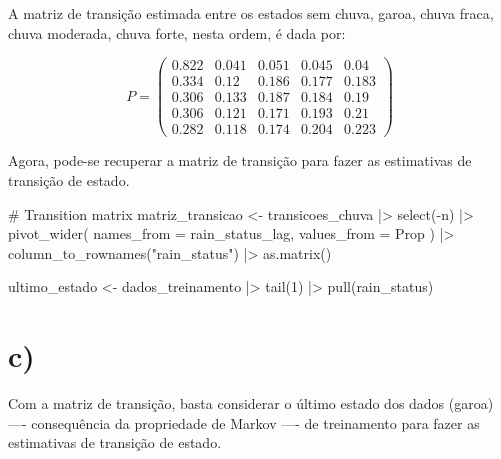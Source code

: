 \documentclass[
  letterpaper,
  DIV=11,
  numbers=noendperiod]{scrreprt}
\newenvironment{Shaded}{\begin{snugshade}}{\end{snugshade}}
\newcommand{\AttributeTok}[1]{\textcolor[rgb]{0.40,0.45,0.13}{#1}}
\newcommand{\CommentTok}[1]{\textcolor[rgb]{0.37,0.37,0.37}{#1}}
\newcommand{\DecValTok}[1]{\textcolor[rgb]{0.68,0.00,0.00}{#1}}
\newcommand{\FunctionTok}[1]{\textcolor[rgb]{0.28,0.35,0.67}{#1}}
\newcommand{\NormalTok}[1]{\textcolor[rgb]{0.00,0.23,0.31}{#1}}
\newcommand{\OtherTok}[1]{\textcolor[rgb]{0.00,0.23,0.31}{#1}}
\newcommand{\SpecialCharTok}[1]{\textcolor[rgb]{0.37,0.37,0.37}{#1}}
\newcommand{\StringTok}[1]{\textcolor[rgb]{0.13,0.47,0.30}{#1}}
\begin{document}
A matriz de transição estimada entre os estados sem chuva, garoa, chuva
fraca, chuva moderada, chuva forte, nesta ordem, é dada por:

\begin{equation}
P =
\begin{pmatrix}
0.822 & 0.041 &  0.051 & 0.045 &  0.04 \\
0.334 & 0.12 &  0.186 & 0.177 &  0.183 \\
0.306 & 0.133 &  0.187 & 0.184 &  0.19 \\
0.306 & 0.121 &  0.171 & 0.193 &  0.21 \\
0.282 & 0.118 &  0.174 & 0.204 &  0.223 
\end{pmatrix}
\end{equation}

Agora, pode-se recuperar a matriz de transição para fazer as estimativas
de transição de estado.

\begin{Shaded}
\begin{Highlighting}[]
\CommentTok{\# Transition matrix}
\NormalTok{matriz\_transicao }\OtherTok{\textless{}{-}}
\NormalTok{    transicoes\_chuva }\SpecialCharTok{|\textgreater{}}
    \FunctionTok{select}\NormalTok{(}\SpecialCharTok{{-}}\NormalTok{n) }\SpecialCharTok{|\textgreater{}}
    \FunctionTok{pivot\_wider}\NormalTok{(}
        \AttributeTok{names\_from =}\NormalTok{ rain\_status\_lag,}
        \AttributeTok{values\_from =}\NormalTok{ Prop}
\NormalTok{    ) }\SpecialCharTok{|\textgreater{}}
    \FunctionTok{column\_to\_rownames}\NormalTok{(}\StringTok{"rain\_status"}\NormalTok{) }\SpecialCharTok{|\textgreater{}}
    \FunctionTok{as.matrix}\NormalTok{()}

\NormalTok{ultimo\_estado }\OtherTok{\textless{}{-}}\NormalTok{ dados\_treinamento }\SpecialCharTok{|\textgreater{}}
    \FunctionTok{tail}\NormalTok{(}\DecValTok{1}\NormalTok{) }\SpecialCharTok{|\textgreater{}}
    \FunctionTok{pull}\NormalTok{(rain\_status)}
\end{Highlighting}
\end{Shaded}

\hypertarget{c}{%
\section*{c)}\label{c}}


Com a matriz de transição, basta considerar o último estado dos dados
(garoa) ---- consequência da propriedade de Markov ---- de treinamento
para fazer as estimativas de transição de estado.
\end{document}
